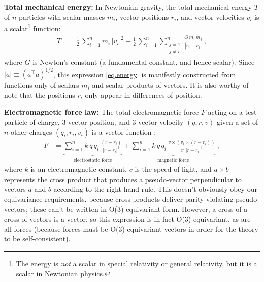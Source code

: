 \documentclass{article}
\renewcommand{\paragraph}[1]{\par\textbf{#1}}
\theoremstyle{Hogg}
\begin{document}
\paragraph{Total mechanical energy:}
In Newtonian gravity, the total mechanical energy $T$ of $n$ particles with scalar masses $m_i$, vector positions $r_i$, and vector velocities $v_i$ is a scalar\footnote{The energy is \emph{not} a scalar in special relativity or general relativity, but it is a scalar in Newtonian physics.} function:
\begin{align}\label{eq.energy}
    T &= \frac{1}{2}\,\textstyle\sum_{i=1}^n m_i\,|v_i|^2 - \frac{1}{2}\,\sum_{i=1}^n \sum_{\substack{j=1\\j\ne i}}^n \frac{G\,m_i\,m_j}{|r_i - r_j|}
    ~,
\end{align}
where $G$ is Newton's constant (a fundamental constant, and hence scalar).
Since $|a|\equiv(a^\top a)^{1/2}$, this expression \eqref{eq.energy} is manifestly constructed from functions only of scalars $m_i$ and scalar products of vectors.
It is also worthy of note that the positions $r_i$ only appear in differences of position.

\paragraph{Electromagnetic force law:}
The total electromagnetic force $F$ acting on a test particle of charge, 3-vector position, and 3-vector velocity $(q,r,v)$ given a set of $n$ other charges $(q_i,r_i,v_i)$ is a vector function \cite{jackson}:
\begin{align}\label{eq.biot}
    F &= \underbrace{\textstyle\sum_{i=1}^n k\,q\,q_i\,\frac{(r - r_i)}{|r - r_i|^3}}_{\text{electrostatic force}} + \underbrace{\textstyle\sum_{i=1}^n k\,q\,q_i\,\frac{v\times(v_i\times(r - r_i))}{c^2\,|r - r_i|^3}}_{\text{magnetic force}}
    ~,
\end{align}
where $k$ is an electromagnetic constant, $c$ is the speed of light, and $a\times b$ represents the cross product that produces a pseudo-vector perpendicular to vectors $a$ and $b$ according to the right-hand rule.
This doesn't obviously obey our equivariance requirements, because cross products deliver parity-violating pseudo-vectors; these can't be written in O($3$)-equivariant form.
However, a cross of a cross of vectors is a vector, so this expression is in fact O($3$)-equivariant, as are all forces (because forces must be O($3$)-equivariant vectors in order for the theory to be self-consistent).
\end{document}

